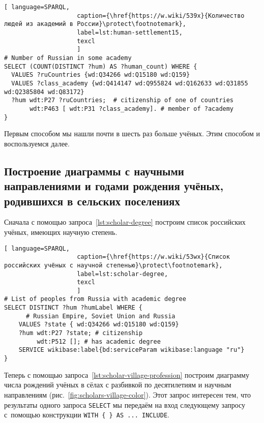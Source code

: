 \begin{lstlisting}[ language=SPARQL, 
                    caption={\href{https://w.wiki/539x}{Количество людей из академий в России}\protect\footnotemark},
                    label=lst:human-settlement15,
                    texcl 
                    ]
# Number of Russian in some academy
SELECT (COUNT(DISTINCT ?hum) AS ?human_count) WHERE {
  VALUES ?ruCountries {wd:Q34266 wd:Q15180 wd:Q159}
  VALUES ?class_academy {wd:Q414147 wd:Q955824 wd:Q162633 wd:Q31855 wd:Q2385804 wd:Q83172}
  ?hum wdt:P27 ?ruCountries;  # citizenship of one of countries
       wdt:P463 [ wdt:P31 ?class_academy]. # member of ?academy
}
\end{lstlisting}%

Первым способом мы нашли почти в шесть раз больше учёных. 
Этим способом и воспользуемся далее. 




\subsection{Построение диаграммы с научными направлениями 
и годами рождения учёных, родившихся в сельских поселениях}

Сначала с помощью запроса~\ref{lst:scholar-degree} 
построим список российских учёных, имеющих научную степень.

\begin{lstlisting}[ language=SPARQL, 
                    caption={\href{https://w.wiki/53wx}{Список российских учёных с научной степенью}\protect\footnotemark},
                    label=lst:scholar-degree,
                    texcl 
                    ]
# List of peoples from Russia with academic degree
SELECT DISTINCT ?hum ?humLabel WHERE {
      # Russian Empire, Soviet Union and Russia
    VALUES ?state { wd:Q34266 wd:Q15180 wd:Q159}
    ?hum wdt:P27 ?state; # citizenship
         wdt:P512 []; # has academic degree 
    SERVICE wikibase:label{bd:serviceParam wikibase:language "ru"}
}
\end{lstlisting}%



Теперь с помощью запроса~\ref{lst:scholar-village-profession} 
построим диаграмму числа рождений учёных в сёлах с разбивкой по десятилетиям %
и научным направлениям (рис.~\ref{fig:scholars-village-color}). 
Этот запрос интересен тем, что результаты одного запроса \lstinline|SELECT| 
мы передаём на вход следующему запросу с~помощью конструкции \lstinline|WITH { } AS ... INCLUDE|. 

